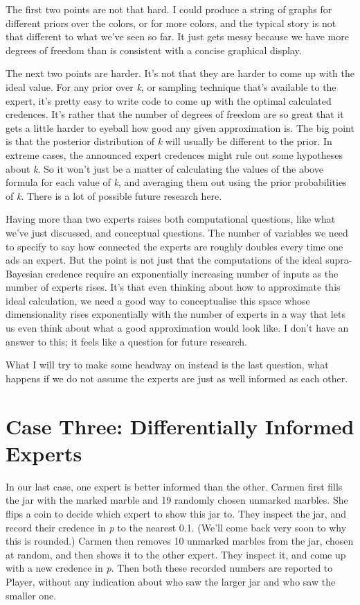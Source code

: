 \documentclass[
  10pt,
  letterpaper,
  DIV=11,
  numbers=noendperiod,
  twoside]{scrartcl}
\begin{document}
The first two points are not that hard. I could produce a string of
graphs for different priors over the colors, or for more colors, and the
typical story is not that different to what we've seen so far. It just
gets messy because we have more degrees of freedom than is consistent
with a concise graphical display.

The next two points are harder. It's not that they are harder to come up
with the ideal value. For any prior over \emph{k}, or sampling technique
that's available to the expert, it's pretty easy to write code to come
up with the optimal calculated credences. It's rather that the number of
degrees of freedom are so great that it gets a little harder to eyeball
how good any given approximation is. The big point is that the posterior
distribution of \emph{k} will usually be different to the prior. In
extreme cases, the announced expert credences might rule out some
hypotheses about \emph{k}. So it won't just be a matter of calculating
the values of the above formula for each value of \emph{k}, and
averaging them out using the prior probabilities of \emph{k}. There is a
lot of possible future research here.

Having more than two experts raises both computational questions, like
what we've just discussed, and conceptual questions. The number of
variables we need to specify to say how connected the experts are
roughly doubles every time one ads an expert. But the point is not just
that the computations of the ideal supra-Bayesian credence require an
exponentially increasing number of inputs as the number of experts
rises. It's that even thinking about how to approximate this ideal
calculation, we need a good way to conceptualise this space whose
dimensionality rises exponentially with the number of experts in a way
that lets us even think about what a good approximation would look like.
I don't have an answer to this; it feels like a question for future
research.

What I will try to make some headway on instead is the last question,
what happens if we do not assume the experts are just as well informed
as each other.

\section{Case Three: Differentially Informed
Experts}\label{case-three-differentially-informed-experts}

In our last case, one expert is better informed than the other. Carmen
first fills the jar with the marked marble and 19 randomly chosen
unmarked marbles. She flips a coin to decide which expert to show this
jar to. They inspect the jar, and record their credence in \emph{p} to
the nearest 0.1. (We'll come back very soon to why this is rounded.)
Carmen then removes 10 unmarked marbles from the jar, chosen at random,
and then shows it to the other expert. They inspect it, and come up with
a new credence in \emph{p}. Then both these recorded numbers are
reported to Player, without any indication about who saw the larger jar
and who saw the smaller one.
\end{document}
